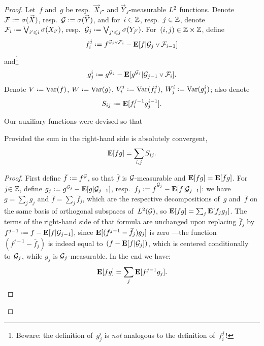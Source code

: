 \begin{proof}
Let~$f$ and~$g$ be resp.\ $\vec{X}_I$- and $\vec{Y}_J$-measurable $\ldb$ functions.
Denote $\mcal{F} \coloneqq \sigma(\vec{X})$, resp.\ $\mcal{G} \coloneqq \sigma(\vec{Y})$,
and for~$i\in\mathbb{Z}$, resp.~$j\in\mathbb{Z}$,
denote $\mcal{F}_i \coloneqq \bigvee_{i'\leq i} \sigma(X_{i'})$,
resp.\ $\mcal{G}_j \coloneqq \bigvee_{j'\leq j} \sigma(Y_{j'})$.
For~$(i,j)\in\mathbb{Z}\times\mathbb{Z}$, define
\[\label{f9113}
f_i^j \coloneqq f^{\mcal{G}_j\vee\mcal{F}_i} - \EE[f|\mcal{G}_j\vee\mcal{F}_{i-1}] \]
and\footnote{Beware: the definition of~$g_j^i$
is \emph{not} analogous to the definition of~$f_i^j$\,!}
\[ g_j^i \coloneqq g^{\mcal{G}_j} - \EE[g^{\mcal{G}_j}|\mcal{G}_{j-1}\vee\mcal{F}_i] .\]
Denote $V\coloneqq\Var(f)$, $W\coloneqq\Var(g)$, $V_i^j\coloneqq\Var(f_i^j)$, $W_j^i\coloneqq\Var(g_j^i)$;
also denote
\[ S_{ij} \coloneqq \EE[f_i^{j-1}g_j^{i-1}] .\]

Our auxiliary functions were devised so that
\begin{Clm}\label{clm4070}
Provided the sum in the right-hand side is absolutely convergent,
\[\label{for5163} \mathop{\smash{\mathbf{E}}}\nolimits[fg] = \sum_{i,j} S_{ij} .\]
\end{Clm}

\begingroup{}\begin{proof}
First define $\bar{f} \coloneqq f^{\mcal{G}}$,
so that $\bar{f}$ is $\mathcal{G}$-measurable and
$\EE[fg] = \EE[\bar{f}g]$.
For~$j \allowbreak {\in \mathbb{Z}}$, define
$g_j \coloneqq g^{\mcal{G}_j} - \EE[g|\mcal{G}_{j-1}]$,
resp.\ $\bar{f}_j \coloneqq {\bar f}^{\mcal{G}_j} - \EE[\bar{f}|\mcal{G}_{j-1}]$:
we have $g=\sum_jg_j$ and $\bar{f}=\sum_j\bar{f}_j$,
which are the respective decompositions of~$g$ and~$\bar{f}$
on the same basis of orthogonal subspaces of~$\ldb(\mcal{G})$,
so $\EE[fg] = \sum_{j} \EE[\bar{f}_jg_j]$.
The terms of the right-hand side of that formula are unchanged upon replacing
$\bar{f}_j$ by~$f^{j-1} \coloneqq f - \EE[f|\mcal{G}_{j-1}]$,
since $\EE[(f^{j-1} - \bar{f}_j)g_j]$ is zero%
—the function~$(f^{j-1} - \bar{f}_j)$ is indeed equal to~$(f-\mathop{\smash{\mathbf{E}}}\nolimits[f|\mathcal{G}_j])$,
which is centered conditionally to~$\mathcal{G}_j$,
while $g_j$ is $\mathcal{G}_j$-measurable.
In the end we have:
\[\label{for5102} \mathop{\smash{\mathbf{E}}}\nolimits[fg] = \sum_j \mathop{\smash{\mathbf{E}}}\nolimits[f^{j-1}g_j] .\]


\end{proof}
\end{proof}
